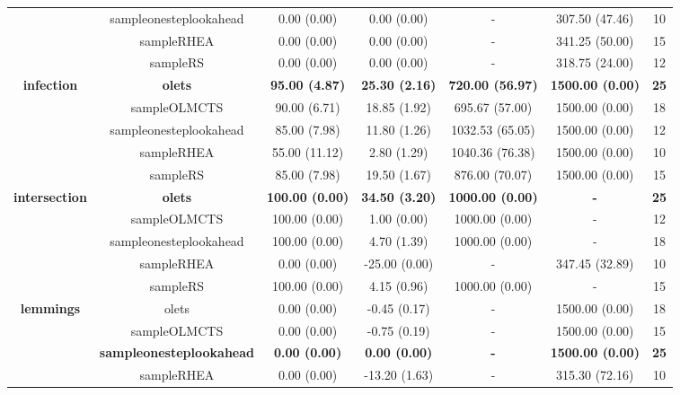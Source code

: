 \begin{table*}[!t]
\begin{center}
\begin{adjustbox}{width=1\textwidth}
\begin{tabular}{|c|c|c|c|c|c|c|}
 \\
\cline{2-7}
 & sampleonesteplookahead & 0.00 (0.00) & 0.00 (0.00) &  -  & 307.50 (47.46) & 10
 \\
\cline{2-7}
 & sampleRHEA & 0.00 (0.00) & 0.00 (0.00) &  -  & 341.25 (50.00) & 15
 \\
\cline{2-7}
 & sampleRS & 0.00 (0.00) & 0.00 (0.00) &  -  & 318.75 (24.00) & 12
 \\
\hline
\hline
\cline{2-7}
\multirow{5}{*}{\textbf{infection}} & \textbf{olets} & \textbf{95.00 (4.87)} & \textbf{25.30 (2.16)} & \textbf{720.00 (56.97)} & \textbf{1500.00 (0.00)} & \textbf{25}
 \\
\cline{2-7}
 & sampleOLMCTS & 90.00 (6.71) & 18.85 (1.92) & 695.67 (57.00) & 1500.00 (0.00) & 18
 \\
\cline{2-7}
 & sampleonesteplookahead & 85.00 (7.98) & 11.80 (1.26) & 1032.53 (65.05) & 1500.00 (0.00) & 12
 \\
\cline{2-7}
 & sampleRHEA & 55.00 (11.12) & 2.80 (1.29) & 1040.36 (76.38) & 1500.00 (0.00) & 10
 \\
\cline{2-7}
 & sampleRS & 85.00 (7.98) & 19.50 (1.67) & 876.00 (70.07) & 1500.00 (0.00) & 15
 \\
\hline
\hline
\cline{2-7}
\multirow{5}{*}{\textbf{intersection}} & \textbf{olets} & \textbf{100.00 (0.00)} & \textbf{34.50 (3.20)} & \textbf{1000.00 (0.00)} & \textbf{ - } & \textbf{25}
 \\
\cline{2-7}
 & sampleOLMCTS & 100.00 (0.00) & 1.00 (0.00) & 1000.00 (0.00) &  -  & 12
 \\
\cline{2-7}
 & sampleonesteplookahead & 100.00 (0.00) & 4.70 (1.39) & 1000.00 (0.00) &  -  & 18
 \\
\cline{2-7}
 & sampleRHEA & 0.00 (0.00) & -25.00 (0.00) &  -  & 347.45 (32.89) & 10
 \\
\cline{2-7}
 & sampleRS & 100.00 (0.00) & 4.15 (0.96) & 1000.00 (0.00) &  -  & 15
 \\
\hline
\hline
\cline{2-7}
\multirow{5}{*}{\textbf{lemmings}} & olets & 0.00 (0.00) & -0.45 (0.17) &  -  & 1500.00 (0.00) & 18
 \\
\cline{2-7}
 & sampleOLMCTS & 0.00 (0.00) & -0.75 (0.19) &  -  & 1500.00 (0.00) & 15
 \\
\cline{2-7}
 & \textbf{sampleonesteplookahead} & \textbf{0.00 (0.00)} & \textbf{0.00 (0.00)} & \textbf{ - } & \textbf{1500.00 (0.00)} & \textbf{25}
 \\
\cline{2-7}
 & sampleRHEA & 0.00 (0.00) & -13.20 (1.63) &  -  & 315.30 (72.16) & 10
 \\

\end{tabular}
\end{adjustbox}
\end{center}
\end{table*}
